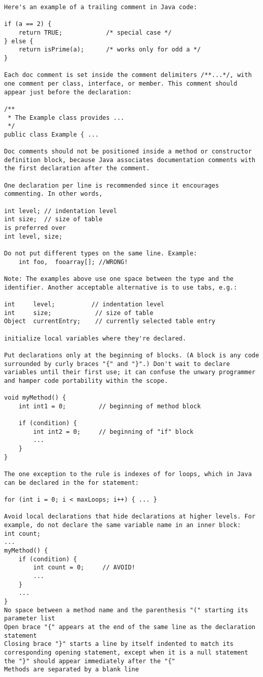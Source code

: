 \begin{lstlisting}
Here's an example of a trailing comment in Java code:

if (a == 2) {
    return TRUE;            /* special case */
} else {
    return isPrime(a);      /* works only for odd a */
}

Each doc comment is set inside the comment delimiters /**...*/, with one comment per class, interface, or member. This comment should appear just before the declaration:

/**
 * The Example class provides ...
 */
public class Example { ...

Doc comments should not be positioned inside a method or constructor definition block, because Java associates documentation comments with the first declaration after the comment.

One declaration per line is recommended since it encourages commenting. In other words,

int level; // indentation level
int size;  // size of table
is preferred over
int level, size;

Do not put different types on the same line. Example:        
    int foo,  fooarray[]; //WRONG!
	
Note: The examples above use one space between the type and the identifier. Another acceptable alternative is to use tabs, e.g.:

int     level;          // indentation level
int     size;            // size of table
Object  currentEntry;    // currently selected table entry

initialize local variables where they're declared.

Put declarations only at the beginning of blocks. (A block is any code surrounded by curly braces "{" and "}".) Don't wait to declare variables until their first use; it can confuse the unwary programmer and hamper code portability within the scope.

void myMethod() {
    int int1 = 0;         // beginning of method block

    if (condition) {
        int int2 = 0;     // beginning of "if" block
        ...
    }
}

The one exception to the rule is indexes of for loops, which in Java can be declared in the for statement:

for (int i = 0; i < maxLoops; i++) { ... }

Avoid local declarations that hide declarations at higher levels. For example, do not declare the same variable name in an inner block:
int count;
...
myMethod() {
    if (condition) {
        int count = 0;     // AVOID!
        ...
    }
    ...
}
No space between a method name and the parenthesis "(" starting its parameter list
Open brace "{" appears at the end of the same line as the declaration statement
Closing brace "}" starts a line by itself indented to match its corresponding opening statement, except when it is a null statement the "}" should appear immediately after the "{"
Methods are separated by a blank line


\end{lstlisting}
